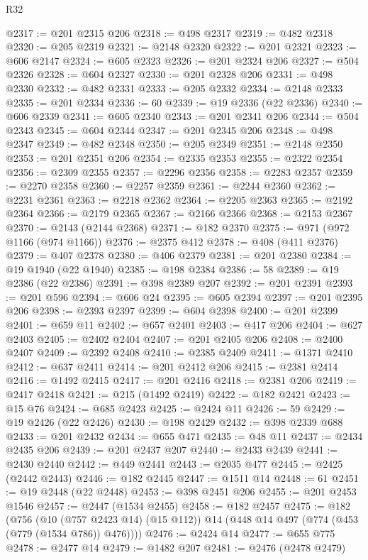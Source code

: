 \begin{lexlean}{R32}
\begin{coremodule}
@2317 := @201 @2315 @206
@2318 := @498 @2317
@2319 := @482 @2318
@2320 := @205 @2319
@2321 := @2148 @2320
@2322 := @201 @2321
@2323 := @606 @2147
@2324 := @605 @2323
@2326 := @201 @2324 @206
@2327 := @504 @2326
@2328 := @604 @2327
@2330 := @201 @2328 @206
@2331 := @498 @2330
@2332 := @482 @2331
@2333 := @205 @2332
@2334 := @2148 @2333
@2335 := @201 @2334
@2336 := 60
@2339 := @19 @2336 (@22 @2336)
@2340 := @606 @2339
@2341 := @605 @2340
@2343 := @201 @2341 @206
@2344 := @504 @2343
@2345 := @604 @2344
@2347 := @201 @2345 @206
@2348 := @498 @2347
@2349 := @482 @2348
@2350 := @205 @2349
@2351 := @2148 @2350
@2353 := @201 @2351 @206
@2354 := @2335 @2353
@2355 := @2322 @2354
@2356 := @2309 @2355
@2357 := @2296 @2356
@2358 := @2283 @2357
@2359 := @2270 @2358
@2360 := @2257 @2359
@2361 := @2244 @2360
@2362 := @2231 @2361
@2363 := @2218 @2362
@2364 := @2205 @2363
@2365 := @2192 @2364
@2366 := @2179 @2365
@2367 := @2166 @2366
@2368 := @2153 @2367
@2370 := @2143 (@2144 @2368)
@2371 := @182 @2370
@2375 := @971 (@972 @1166 (@974 @1166))
@2376 := @2375 @412
@2378 := @408 (@411 @2376)
@2379 := @407 @2378
@2380 := @406 @2379
@2381 := @201 @2380
@2384 := @19 @1940 (@22 @1940)
@2385 := @198 @2384
@2386 := 58
@2389 := @19 @2386 (@22 @2386)
@2391 := @398 @2389 @207
@2392 := @201 @2391
@2393 := @201 @596
@2394 := @606 @24
@2395 := @605 @2394
@2397 := @201 @2395 @206
@2398 := @2393 @2397
@2399 := @604 @2398
@2400 := @201 @2399
@2401 := @659 @11
@2402 := @657 @2401
@2403 := @417 @206
@2404 := @627 @2403
@2405 := @2402 @2404
@2407 := @201 @2405 @206
@2408 := @2400 @2407
@2409 := @2392 @2408
@2410 := @2385 @2409
@2411 := @1371 @2410
@2412 := @637 @2411
@2414 := @201 @2412 @206
@2415 := @2381 @2414
@2416 := @1492 @2415
@2417 := @201 @2416
@2418 := @2381 @206
@2419 := @2417 @2418
@2421 := @215 (@1492 @2419)
@2422 := @182 @2421
@2423 := @15 @76
@2424 := @685 @2423
@2425 := @2424 @11
@2426 := 59
@2429 := @19 @2426 (@22 @2426)
@2430 := @198 @2429
@2432 := @398 @2339 @688
@2433 := @201 @2432
@2434 := @655 @471
@2435 := @48 @11
@2437 := @2434 @2435 @206
@2439 := @201 @2437 @207
@2440 := @2433 @2439
@2441 := @2430 @2440
@2442 := @449 @2441
@2443 := @2035 @477
@2445 := @2425 (@2442 @2443)
@2446 := @182 @2445
@2447 := @1511 @14
@2448 := 61
@2451 := @19 @2448 (@22 @2448)
@2453 := @398 @2451 @206
@2455 := @201 @2453 @1546
@2457 := @2447 (@1534 @2455)
@2458 := @182 @2457
@2475 := @182
    (@756
      (@10 (@757 @2423 @14) (@15 @112))
      @14
      (@448 @14 @497 (@774 (@453 (@779 (@1534 @786)) @476))))
@2476 := @2424 @14
@2477 := @655 @775
@2478 := @2477 @14
@2479 := @1482 @207
@2481 := @2476 (@2478 @2479)

\end{coremodule}
\end{lexlean}
